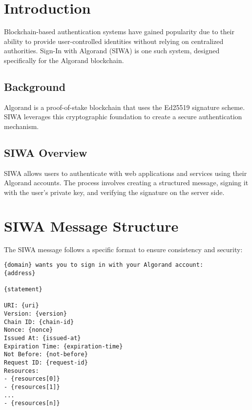 \documentclass[12pt, a4paper, twocolumn]{article}
\begin{document}

\twocolumn[
  \begin{@twocolumnfalse}
    \maketitle
    \begin{abstract}
      \abstractText
      \newline \newline
    \end{abstract}
  \end{@twocolumnfalse}
]


\section{Introduction}

Blockchain-based authentication systems have gained popularity due to their ability to provide user-controlled identities without relying on centralized authorities. Sign-In with Algorand (SIWA) is one such system, designed specifically for the Algorand blockchain.

\subsection{Background}

Algorand is a proof-of-stake blockchain that uses the Ed25519 signature scheme. SIWA leverages this cryptographic foundation to create a secure authentication mechanism.

\subsection{SIWA Overview}

SIWA allows users to authenticate with web applications and services using their Algorand accounts. The process involves creating a structured message, signing it with the user's private key, and verifying the signature on the server side.

\section{SIWA Message Structure}

The SIWA message follows a specific format to ensure consistency and security:

\begin{verbatim}
{domain} wants you to sign in with your Algorand account:
{address}

{statement}

URI: {uri}
Version: {version}
Chain ID: {chain-id}
Nonce: {nonce}
Issued At: {issued-at}
Expiration Time: {expiration-time}
Not Before: {not-before}
Request ID: {request-id}
Resources:
- {resources[0]}
- {resources[1]}
...
- {resources[n]}
\end{verbatim}
\end{document}
